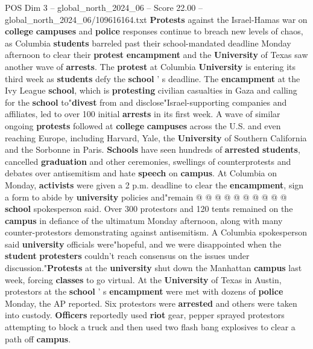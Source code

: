 \begin{textsample}{POS Dim 3 – global\_north\_2024\_06 – Score 22.00 – global\_north\_2024\_06/109616164.txt}  \label{ex:f3_pos_072}
\textbf{Protests} against the Israel-Hamas war on \textbf{college} \textbf{campuses} and \textbf{police} responses continue to breach new levels of chaos, as Columbia \textbf{students} barreled past their school-mandated deadline Monday afternoon to clear their \textbf{protest} \textbf{encampment} and the \textbf{University} of Texas saw another wave of \textbf{arrests}.
The \textbf{protest} at Columbia \textbf{University} is entering its third week as \textbf{students} defy the \textbf{school} ' s deadline.
The \textbf{encampment} at the Ivy League \textbf{school}, which is \textbf{protesting} civilian casualties in Gaza and calling for the \textbf{school} to"\textbf{divest} from and disclose"Israel-supporting companies and affiliates, led to over 100 initial \textbf{arrests} in its first week.
A wave of similar ongoing \textbf{protests} followed at \textbf{college} \textbf{campuses} across the U.S. and even reaching Europe, including Harvard, Yale, the \textbf{University} of Southern California and the Sorbonne in Paris. \textbf{Schools} have seen hundreds of \textbf{arrested} \textbf{students}, cancelled \textbf{graduation} and other ceremonies, swellings of counterprotests and debates over antisemitism and hate \textbf{speech} on \textbf{campus}.
At Columbia on Monday, \textbf{activists} were given a 2 p.m. deadline to clear the \textbf{encampment}, sign a form to abide by \textbf{university} policies and"remain @ @ @ @ @ @ @ @ @ @ \textbf{school} spokesperson said.
Over 300 protestors and 120 tents remained on the \textbf{campus} in defiance of the ultimatum Monday afternoon, along with many counter-protestors demonstrating against antisemitism.
A Columbia spokesperson said \textbf{university} officials were"hopeful, and we were disappointed when the \textbf{student} \textbf{protesters} couldn't reach consensus on the issues under discussion."\textbf{Protests} at the \textbf{university} shut down the Manhattan \textbf{campus} last week, forcing \textbf{classes} to go virtual.
At the \textbf{University} of Texas in Austin, protestors at the \textbf{school} ' s \textbf{encampment} were met with dozens of \textbf{police} Monday, the AP reported.
Six protestors were \textbf{arrested} and others were taken into custody. \textbf{Officers} reportedly used \textbf{riot} gear, pepper sprayed protestors attempting to block a truck and then used two flash bang explosives to clear a path off \textbf{campus}.

\end{textsample}
